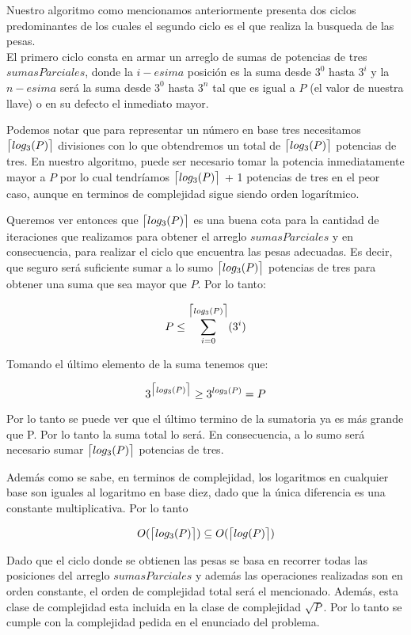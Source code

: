 
Nuestro algoritmo como mencionamos anteriormente presenta dos ciclos predominantes de los cuales el segundo ciclo es el que realiza la busqueda de las pesas.\\

El primero ciclo consta en armar un arreglo de sumas de potencias de tres $sumasParciales$, donde la $i-esima$ posición es la suma desde $3^0$ hasta $3^i$ y la $n-esima$ será la suma desde $3^0$ hasta $3^n$  tal que es igual a $P$ (el valor de nuestra llave) o en su defecto el inmediato mayor. 

Podemos notar que para representar un número en base tres necesitamos $\ceil[\big]{log_3(P)}$ divisiones con lo que obtendremos un total de $\ceil[\big]{log_3(P)}$  potencias de tres. 
En nuestro algoritmo, puede ser necesario tomar la potencia inmediatamente mayor a $P$ por lo cual tendr\'iamos $\ceil[\big]{log_3(P)}$ + 1 potencias de tres en el peor caso, aunque en terminos de complejidad sigue siendo orden logar\'itmico. 

Queremos ver entonces que  $\ceil[\big]{log_3(P)}$ es una buena cota para la cantidad de iteraciones que realizamos para obtener el arreglo $sumasParciales$ y en consecuencia, para realizar el ciclo que encuentra las pesas adecuadas. Es decir, que seguro será suficiente sumar a lo sumo $\ceil[\big]{log_3(P)}$ potencias de tres para obtener una suma que sea mayor que $P$. Por lo tanto:

\begin{equation}
P \leq \sum_{i=0}^{\ceil[\big]{log_3(P)}}(3^i)
\end{equation}

Tomando el último elemento de la suma tenemos que:

\begin{equation}
3^{\ceil[\big]{log_3(P)}} \geq 3^{log_3(P)} = P
\end{equation}

Por lo tanto se puede ver que el último termino de la sumatoria ya es más grande que P. Por lo tanto la suma total lo será. En consecuencia, a lo sumo será necesario sumar $\ceil[\big]{log_3(P)}$ potencias de tres.

Además como se sabe, en terminos de complejidad, los logaritmos en cualquier base son iguales al logaritmo en base diez, dado que la única diferencia es una constante multiplicativa. Por lo tanto 


\begin{equation}
O(\ceil[\big]{log_3(P)}) \subseteq O(\ceil[\big]{log(P)})
\end{equation}

Dado que el ciclo donde se obtienen las pesas se basa en recorrer todas las posiciones del arreglo $sumasParciales$ y además las operaciones realizadas son en orden constante, el orden de complejidad total será el mencionado.
Además, esta clase de complejidad esta incluida en la clase de complejidad $\sqrt{P}$. Por lo tanto se cumple con la complejidad pedida en el enunciado del problema.
